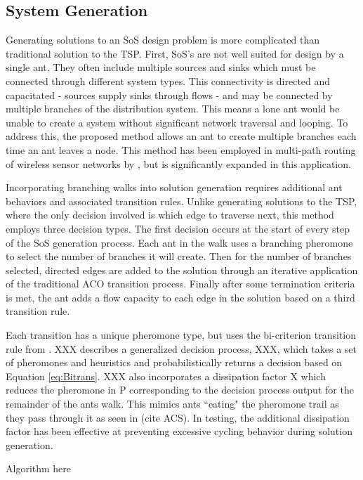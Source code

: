 \documentclass[preprint,12pt]{elsarticle}
\begin{document}
\subsection{System Generation} \label{sec:trans}
Generating solutions to an SoS design problem is more complicated than traditional solution to the TSP. First, SoS's are not well suited for design by a single ant. They often include multiple sources and sinks which must be connected through different system types. This connectivity is directed and capacitated - sources supply sinks through flows - and may be connected by multiple branches of the distribution system. This means a lone ant would be unable to create a system without significant network traversal and looping. To address this, the proposed method allows an ant to create multiple branches each time an ant leaves a node. This method has been employed in multi-path routing of wireless sensor networks by \cite{Yang2010}, but is significantly expanded in this application. 

Incorporating branching walks into solution generation requires additional ant behaviors and associated transition rules. Unlike generating solutions to the TSP, where the only decision involved is which edge to traverse next, this method employs three decision types. The first decision occurs at the start of every step of the SoS generation process. Each ant in the walk uses a branching pheromone to select the number of branches it will create. Then for the number of branches selected, directed edges are added to the solution through an iterative application of the traditional ACO transition process. Finally after some termination criteria is met, the ant adds a flow capacity to each edge in the solution based on a third transition rule.

Each transition has a unique pheromone type, but uses the bi-criterion transition rule from \cite{Iredi2001}. XXX describes a generalized decision process, XXX, which takes a set of pheromones and heuristics and probabilistically returns a decision based on Equation \ref{eq:Bitrans}. XXX also incorporates a dissipation factor X which reduces the pheromone in P corresponding to the decision process output for the remainder of the ants walk. This mimics ants ``eating" the pheromone trail as they pass through it as seen in (cite ACS). In testing, the additional dissipation factor has been effective at preventing excessive cycling behavior during solution generation.

Algorithm here
\end{document}
